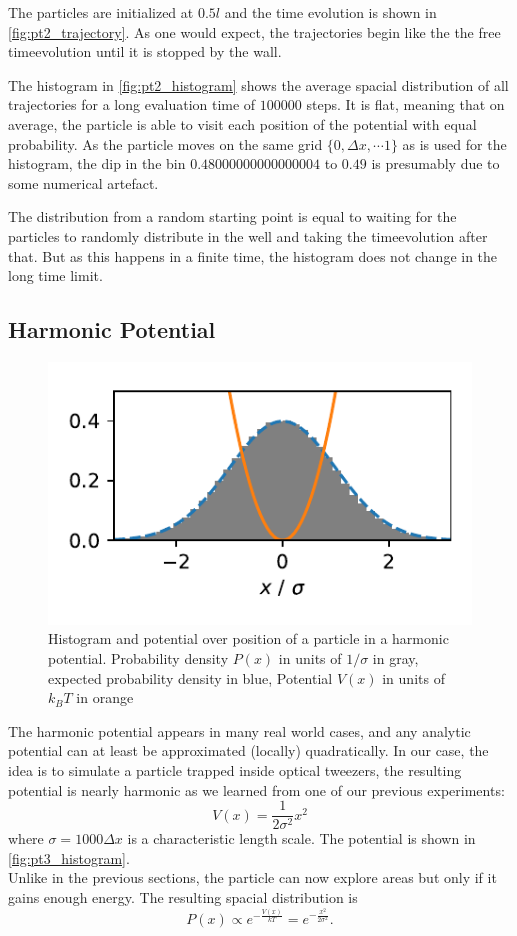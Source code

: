 \documentclass[
    parskip=half, 
    twoside=false,
    twocolumn=true,
    fontsize=11pt,
]{scrarticle}
\begin{document}
The particles are initialized at $0.5 l$ and the time evolution is shown in \autoref{fig:pt2_trajectory}.
As one would expect, the trajectories begin like the the free timeevolution until it is stopped by the wall.

The histogram in \autoref{fig:pt2_histogram} shows the average spacial distribution of all trajectories for a long evaluation time of $100000$ steps. 
It is flat, meaning that on average, the particle is able to visit each position of the potential with equal probability.
As the particle moves on the same grid $\{0, \Delta x, \cdots 1\}$ as is used for the histogram, the dip in the bin $0.48000000000000004$ to $0.49$ is presumably due to some numerical artefact.

The distribution from a random starting point is equal to waiting for the particles to randomly distribute in the well and taking the timeevolution after that.
But as this happens in a finite time, the histogram does not change in the long time limit.


\subsection{Harmonic Potential}
\begin{figure}
    \centering
    \includegraphics{figures/03 histogram.pdf}
    \caption{
        Histogram and potential over position of a particle in a harmonic potential.
        Probability density $P(x)$ in units of $1/\sigma$ in gray, expected probability density in blue, Potential $V(x)$ in units of $k_B T$ in orange
    }
    \label{fig:pt3_histogram}
\end{figure}

The harmonic potential appears in many real world cases, and any analytic potential can at least be approximated (locally) quadratically. In our case, the idea is to simulate a particle trapped inside optical tweezers, the resulting potential is nearly harmonic as we learned from one of our previous experiments:
$$ V(x) = \frac{1}{2 \sigma^2} x^2$$
where $\sigma = 1000 \Delta x$ is a characteristic length scale.
The potential is shown in \autoref{fig:pt3_histogram}.
\\
Unlike in the previous sections, the particle can now explore areas but only if it gains enough energy. The resulting spacial distribution is
$$
\label{eq:canonical_dist}
 P(x) \propto e^{-\frac{V(x)}{k T}} = e^{-\frac{x^2}{2 \sigma^2}}.
$$
\end{document}
